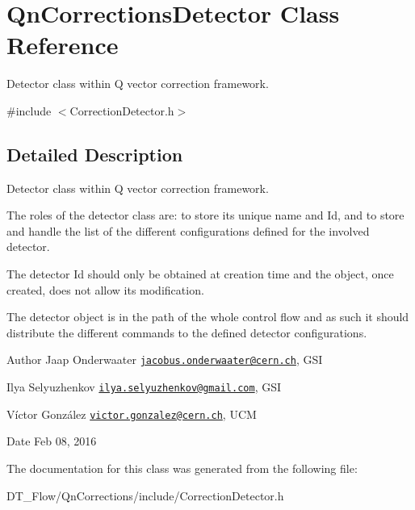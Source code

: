 \hypertarget{classQnCorrectionsDetector}{}\section{Qn\+Corrections\+Detector Class Reference}
\label{classQnCorrectionsDetector}


Detector class within Q vector correction framework.  




{\ttfamily \#include $<$Correction\+Detector.\+h$>$}



\subsection{Detailed Description}
Detector class within Q vector correction framework. 

The roles of the detector class are\+: to store its unique name and Id, and to store and handle the list of the different configurations defined for the involved detector.

The detector Id should only be obtained at creation time and the object, once created, does not allow its modification.

The detector object is in the path of the whole control flow and as such it should distribute the different commands to the defined detector configurations.

\begin{DoxyAuthor}{Author}
Jaap Onderwaater \href{mailto:jacobus.onderwaater@cern.ch}{\tt jacobus.\+onderwaater@cern.\+ch}, G\+SI 

Ilya Selyuzhenkov \href{mailto:ilya.selyuzhenkov@gmail.com}{\tt ilya.\+selyuzhenkov@gmail.\+com}, G\+SI 

Víctor González \href{mailto:victor.gonzalez@cern.ch}{\tt victor.\+gonzalez@cern.\+ch}, U\+CM 
\end{DoxyAuthor}
\begin{DoxyDate}{Date}
Feb 08, 2016 
\end{DoxyDate}


The documentation for this class was generated from the following file\+:\begin{DoxyCompactItemize}
\item 
D\+T\+\_\+\+Flow/\+Qn\+Corrections/include/Correction\+Detector.\+h\end{DoxyCompactItemize}
